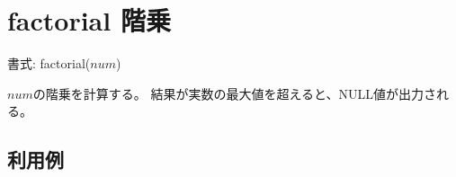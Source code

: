 
%

\section{factorial 階乗\label{sect:factorial}}

書式: factorial($num$)

$num$の階乗を計算する。
結果が実数の最大値を超えると、NULL値が出力される。

\subsection*{利用例}


%
